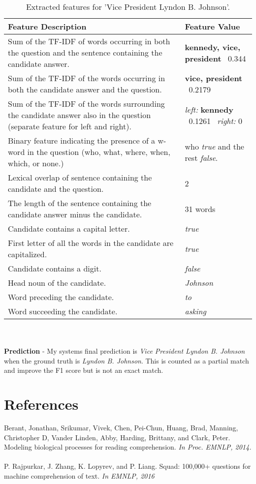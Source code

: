 \documentclass[a4paper, 11pt]{article} %
\begin{document}
\begin{table}[H]
\centering
{\renewcommand{\arraystretch}{1.2}%
\begin{tabular}{|p{8cm}|p{4cm}|}
\hline
Feature Description & Feature Value\\
\hline
\hline
Sum of the TF-IDF of words occurring in both the question and the sentence containing the candidate answer. & \textbf{kennedy, vice, president} \ 0.344 \\ \hline
Sum of the TF-IDF of the words occurring in both the candidate answer and the question. & \textbf{vice, president} \  0.2179\\ \hline
Sum of the TF-IDF of the words surrounding the candidate answer also in the question (separate feature for left and right). & \textit{left:} \textbf{kennedy} \ 0.1261 \ \textit{right:} 0\\ \hline
Binary feature indicating the presence of a w-word in the question (who, what, where, when, which, or none.) & who \textit{true} and the rest \textit{false}.\\ \hline
Lexical overlap of sentence containing the candidate and the question. & 2\\ \hline
The length of the sentence containing the candidate answer minus the candidate. & 31 words\\ \hline
Candidate contains a capital letter. & \textit{true}\\ \hline
First letter of all the words in the candidate are capitalized. & \textit{true}\\ \hline
Candidate contains a digit. & \textit{false} \\ \hline
Head noun of the candidate. & \textit{Johnson}\\ \hline
Word preceding the candidate. & \textit{to}\\ \hline
Word succeeding the candidate. & \textit{asking}\\ \hline
\end{tabular}}
\caption{Extracted features for 'Vice President Lyndon B. Johnson'.}
\end{table}
\ \\~\\
\textbf{Prediction} - My systems final prediction is \textit{Vice President Lyndon B. Johnson} when the ground truth is \textit{Lyndon B. Johnson}. This is counted as a partial match and improve the F1 score but is not an exact match.
\newpage
\section*{References}

Berant, Jonathan, Srikumar, Vivek, Chen, Pei-Chun, Huang, Brad, Manning, Christopher D, Vander Linden, Abby, Harding, Brittany, and Clark, Peter. Modeling biological processes for reading comprehension. \textit{In Proc. EMNLP, 2014.}
\\~\\
P. Rajpurkar, J. Zhang, K. Lopyrev, and P. Liang. Squad: 100,000+ questions
for machine comprehension of text. \textit{In EMNLP, 2016}
\end{document}
